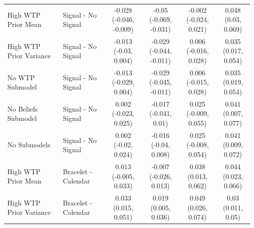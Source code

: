 {\begin{tabular}[t]{llcccc}
\midrule
High WTP Prior Mean & Signal - No Signal & \makecell[c]{-0.028\\(-0.046, -0.009)} & \makecell[c]{-0.05\\(-0.069, -0.031)} & \makecell[c]{-0.002\\(-0.024, 0.021)} & \makecell[c]{0.048\\(0.03, 0.069)}\\
High WTP Prior Variance & Signal - No Signal & \makecell[c]{-0.013\\(-0.03, 0.004)} & \makecell[c]{-0.029\\(-0.044, -0.011)} & \makecell[c]{0.006\\(-0.016, 0.028)} & \makecell[c]{0.035\\(0.017, 0.054)}\\
No WTP Submodel & Signal - No Signal & \makecell[c]{-0.013\\(-0.029, 0.004)} & \makecell[c]{-0.029\\(-0.045, -0.011)} & \makecell[c]{0.006\\(-0.015, 0.028)} & \makecell[c]{0.035\\(0.019, 0.054)}\\
No Beliefs Submodel & Signal - No Signal & \makecell[c]{0.002\\(-0.023, 0.025)} & \makecell[c]{-0.017\\(-0.041, 0.01)} & \makecell[c]{0.025\\(-0.009, 0.055)} & \makecell[c]{0.041\\(0.007, 0.077)}\\
No Submodels & Signal - No Signal & \makecell[c]{0.002\\(-0.02, 0.024)} & \makecell[c]{-0.016\\(-0.04, 0.008)} & \makecell[c]{0.025\\(-0.008, 0.054)} & \makecell[c]{0.041\\(0.009, 0.072)}\\
High WTP Prior Mean & Bracelet - Calendar & \makecell[c]{0.013\\(-0.005, 0.033)} & \makecell[c]{-0.007\\(-0.026, 0.013)} & \makecell[c]{0.038\\(0.013, 0.062)} & \makecell[c]{0.044\\(0.023, 0.066)}\\
High WTP Prior Variance & Bracelet - Calendar & \makecell[c]{0.033\\(0.015, 0.051)} & \makecell[c]{0.019\\(0.005, 0.036)} & \makecell[c]{0.049\\(0.026, 0.074)} & \makecell[c]{0.03\\(0.011, 0.05)}\\

\end{tabular}}

